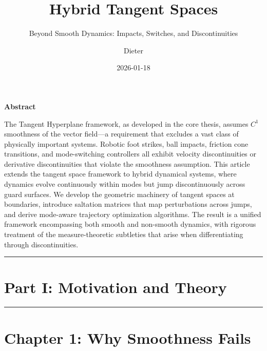 \documentclass[
  letterpaper,
  DIV=11,
  numbers=noendperiod]{scrartcl}
\title{Hybrid Tangent Spaces}
\subtitle{Beyond Smooth Dynamics: Impacts, Switches, and
Discontinuities}
\author{Dieter}
\date{2026-01-18}
\begin{document}
\maketitle


\begin{tcolorbox}[enhanced jigsaw, leftrule=.75mm, toprule=.15mm, breakable, colframe=quarto-callout-note-color-frame, left=2mm, opacityback=0, rightrule=.15mm, arc=.35mm, colback=white, bottomrule=.15mm]

\vspace{-3mm}\textbf{Abstract}\vspace{3mm}

The Tangent Hyperplane framework, as developed in the core thesis,
assumes \(C^1\) smoothness of the vector field---a requirement that
excludes a vast class of physically important systems. Robotic foot
strikes, ball impacts, friction cone transitions, and mode-switching
controllers all exhibit velocity discontinuities or derivative
discontinuities that violate the smoothness assumption. This article
extends the tangent space framework to hybrid dynamical systems, where
dynamics evolve continuously within modes but jump discontinuously
across guard surfaces. We develop the geometric machinery of tangent
spaces at boundaries, introduce saltation matrices that map
perturbations across jumps, and derive mode-aware trajectory
optimization algorithms. The result is a unified framework encompassing
both smooth and non-smooth dynamics, with rigorous treatment of the
measure-theoretic subtleties that arise when differentiating through
discontinuities.

\end{tcolorbox}

\begin{center}\rule{0.5\linewidth}{0.5pt}\end{center}

\section*{Part I: Motivation and
Theory}\label{part-i-motivation-and-theory}

\begin{center}\rule{0.5\linewidth}{0.5pt}\end{center}

\section{Chapter 1: Why Smoothness Fails}\label{sec-smoothness-fails}
\end{document}

